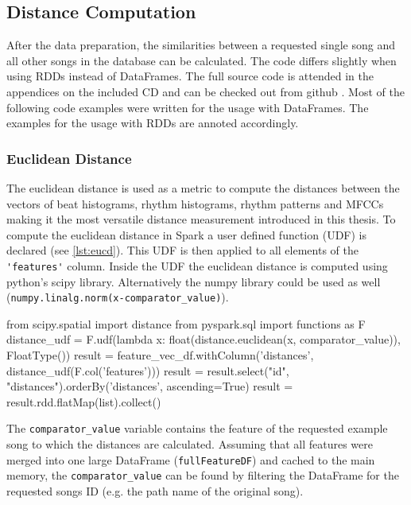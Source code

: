 \subsection{Distance Computation}

After the data preparation, the similarities between a requested single song and all other songs in the database can be calculated. The code differs slightly when using RDDs instead of DataFrames. The full source code is attended in the appendices on the included CD and can be checked out from github \cite{github-code}. Most of the following code examples were written for the usage with DataFrames. The examples for the usage with RDDs are annoted accordingly.\\

\subsubsection{Euclidean Distance}

The euclidean distance is used as a metric to compute the distances between the vectors of beat histograms, rhythm histograms, rhythm patterns and MFCCs making it the most versatile distance measurement introduced in this thesis. To compute the euclidean distance in Spark a user defined function (UDF) is declared (see \ref{lst:eucd}). This UDF is then applied to all elements of the \lstinline{'features'} column. Inside the UDF the euclidean distance is computed using python's scipy library. Alternatively the numpy library could be used as well (\lstinline{numpy.linalg.norm(x-comparator_value)}). 

\begin{pythonCode}[frame=single,label={lst:eucd},caption={euclidean distance DF},captionpos=b]
from scipy.spatial import distance
from pyspark.sql import functions as F
distance_udf = F.udf(lambda x: float(distance.euclidean(x, comparator_value)), FloatType())
result = feature_vec_df.withColumn('distances', distance_udf(F.col('features')))
result = result.select("id", "distances").orderBy('distances', ascending=True)
result = result.rdd.flatMap(list).collect()
\end{pythonCode}

\noindent The \lstinline{comparator_value} variable contains the feature of the requested example song to which the distances are calculated. Assuming that all features were merged into one large DataFrame (\lstinline{fullFeatureDF}) and cached to the main memory, the \lstinline{comparator_value} can be found by filtering the DataFrame for the requested songs ID (e.g. the path name of the original song).

